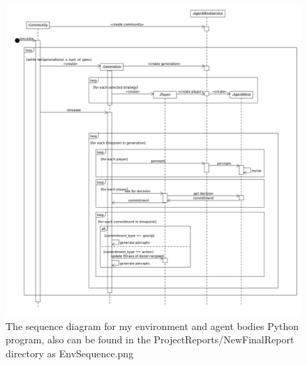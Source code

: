 \documentclass[]{final_report}
\begin{document}
\begin{figure}
	\begin{center}
	\includegraphics[width=\textwidth]{EnvSequence.png}
	\caption{The sequence diagram for my environment and agent bodies Python program, also can be found in the ProjectReports/NewFinalReport directory as EnvSequence.png}
	\label{fig:sequence}
	\end{center}
\end{figure}
\end{document}
